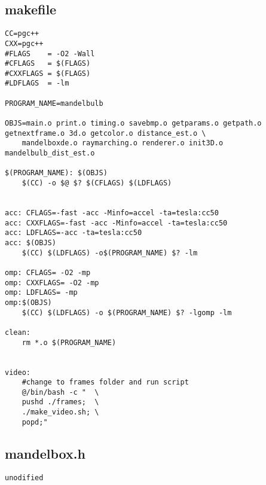 \documentclass[]{article}
\begin{document}
\subsection{makefile}
\begin{Verbatim}[fontsize= \footnotesize, tabsize=4]
CC=pgc++
CXX=pgc++
#FLAGS    = -O2 -Wall
#CFLAGS   = $(FLAGS)
#CXXFLAGS = $(FLAGS)
#LDFLAGS  = -lm

PROGRAM_NAME=mandelbulb

OBJS=main.o print.o timing.o savebmp.o getparams.o getpath.o getnextframe.o 3d.o getcolor.o distance_est.o \
	mandelboxde.o raymarching.o renderer.o init3D.o mandelbulb_dist_est.o

$(PROGRAM_NAME): $(OBJS)
	$(CC) -o $@ $? $(CFLAGS) $(LDFLAGS)


acc: CFLAGS=-fast -acc -Minfo=accel -ta=tesla:cc50
acc: CXXFLAGS=-fast -acc -Minfo=accel -ta=tesla:cc50
acc: LDFLAGS=-acc -ta=tesla:cc50
acc: $(OBJS)
	$(CC) $(LDFLAGS) -o$(PROGRAM_NAME) $? -lm

omp: CFLAGS= -O2 -mp
omp: CXXFLAGS= -O2 -mp
omp: LDFLAGS= -mp
omp:$(OBJS)
	$(CC) $(LDFLAGS) -o $(PROGRAM_NAME) $? -lgomp -lm

clean:
	rm *.o $(PROGRAM_NAME)


video:
	#change to frames folder and run script
	@/bin/bash -c "  \
	pushd ./frames;  \
	./make_video.sh; \
	popd;"

\end{Verbatim}

\subsection{mandelbox.h}
\begin{Verbatim}[fontsize= \footnotesize, tabsize=4]
unodified
\end{Verbatim}
\end{document}
